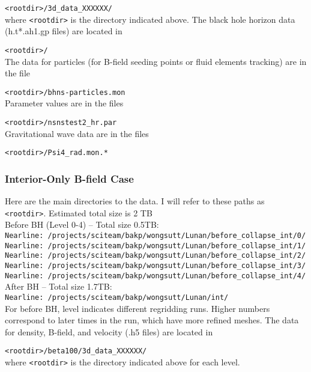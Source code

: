 \documentclass{article}
\begin{document}
	\verb|<rootdir>/3d_data_XXXXXX/|   \\
where \verb|<rootdir>| is the directory indicated above. The black hole horizon data (h.t*.ah1.gp files) are located in
	
	\verb|<rootdir>/| \\
The data for particles (for B-field seeding points or fluid elements tracking) are in the file 
	
	\verb|<rootdir>/bhns-particles.mon| \\
Parameter values are in the files

	\verb|<rootdir>/nsnstest2_hr.par| \\
Gravitational wave data are in the files

	\verb|<rootdir>/Psi4_rad.mon.* | \\


\subsubsection{Interior-Only B-field Case}
Here are the main directories to the data. I will refer to these paths as \verb|<rootdir>|. Estimated total size is 2 TB \\

Before BH (Level 0-4) -- Total size 0.5TB: \\
	\verb|Nearline: /projects/sciteam/bakp/wongsutt/Lunan/before_collapse_int/0/| \\
	\verb|Nearline: /projects/sciteam/bakp/wongsutt/Lunan/before_collapse_int/1/| \\
	\verb|Nearline: /projects/sciteam/bakp/wongsutt/Lunan/before_collapse_int/2/| \\
	\verb|Nearline: /projects/sciteam/bakp/wongsutt/Lunan/before_collapse_int/3/| \\
	\verb|Nearline: /projects/sciteam/bakp/wongsutt/Lunan/before_collapse_int/4/| \\
	
After BH -- Total size 1.7TB: \\
	\verb|Nearline: /projects/sciteam/bakp/wongsutt/Lunan/int/| \\

For before BH, level indicates different regridding runs. Higher numbers correspond to later times in the run, which have more refined meshes. The data for density, B-field, and velocity (.h5 files) are located in
	
	\verb|<rootdir>/beta100/3d_data_XXXXXX/|   \\
where \verb|<rootdir>| is the directory indicated above for each level. \\
\end{document}
